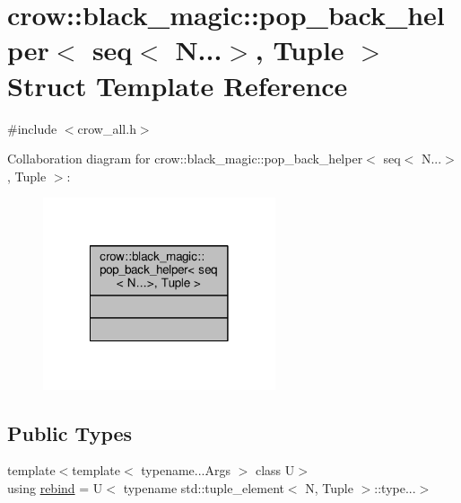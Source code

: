 \hypertarget{structcrow_1_1black__magic_1_1pop__back__helper_3_01seq_3_01_n_8_8_8_4_00_01_tuple_01_4}{\section{crow\-:\-:black\-\_\-magic\-:\-:pop\-\_\-back\-\_\-helper$<$ seq$<$ N...$>$, Tuple $>$ Struct Template Reference}
\label{structcrow_1_1black__magic_1_1pop__back__helper_3_01seq_3_01_n_8_8_8_4_00_01_tuple_01_4}
}


{\ttfamily \#include $<$crow\-\_\-all.\-h$>$}



Collaboration diagram for crow\-:\-:black\-\_\-magic\-:\-:pop\-\_\-back\-\_\-helper$<$ seq$<$ N...$>$, Tuple $>$\-:
\nopagebreak
\begin{figure}[H]
\begin{center}
\leavevmode
\includegraphics[width=194pt]{structcrow_1_1black__magic_1_1pop__back__helper_3_01seq_3_01_n_8_8_8_4_00_01_tuple_01_4__coll__graph}
\end{center}
\end{figure}
\subsection*{Public Types}
\begin{DoxyCompactItemize}
\item 
{\footnotesize template$<$template$<$ typename...\-Args $>$ class U$>$ }\\using \hyperlink{structcrow_1_1black__magic_1_1pop__back__helper_3_01seq_3_01_n_8_8_8_4_00_01_tuple_01_4_a6d301c081b79ce4ee16aac8e87e6a978}{rebind} = U$<$ typename std\-::tuple\-\_\-element$<$ N, Tuple $>$\-::type...$>$
\end{DoxyCompactItemize}


